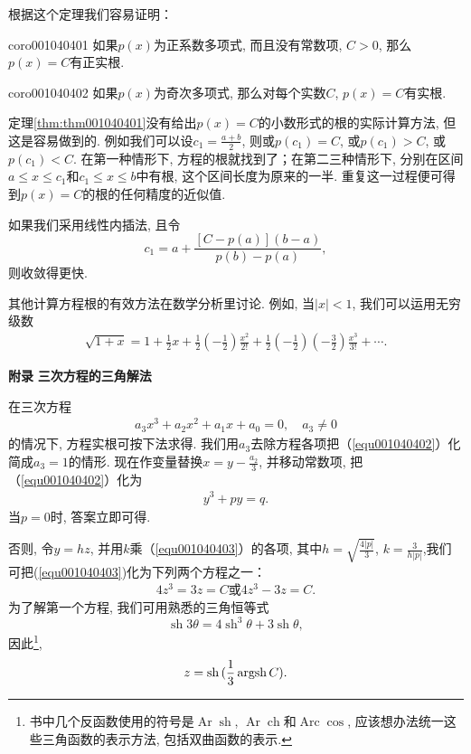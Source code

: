 根据这个定理我们容易证明：
\begin{corollary}{}{coro001040401}
如果$p(x)$为正系数多项式, 而且没有常数项, $C > 0$, 那么$p(x)=C$有正实根. 
\end{corollary}

\begin{corollary}{}{coro001040402}
如果$p(x)$为奇次多项式, 那么对每个实数$C$, $p(x)=C$有实根. 
\end{corollary}

定理\ref{thm:thm001040401}没有给出$p(x)=C$的小数形式的根的实际计算方法, 但这是容易做到的. 例如我们可以设$c_1 = \frac{a+b}{2}$, 则或$p(c_1) = C$, 或$p(c_1) > C$, 或$p(c_1) < C$. 在第一种情形下, 方程的根就找到了；在第二三种情形下, 分别在区间$a \le x \le c_1$和$c_1 \le x \le b$中有根, 这个区间长度为原来的一半. 重复这一过程便可得到$p(x)=C$的根的任何精度的近似值. 

如果我们采用线性内插法, 且令
\[
c_1 = a + \frac{[C-p(a)](b-a)}{p(b)-p(a)},
\]
则收敛得更快. 

其他计算方程根的有效方法在数学分析里讨论. 例如, 当$|x|<1$, 我们可以运用无穷级数
\begin{gather}\label{equ001040401}
\sqrt{1+x} = 1 + \frac{1}{2}x + \frac{1}{2}(-\frac{1}{2})\frac{x^2}{2!}+\frac{1}{2}(-\frac{1}{2})(-\frac{3}{2})\frac{x^3}{3!}+\cdots.
\end{gather}

\textbf{附录} \quad \textbf{三次方程的三角解法}

在三次方程
\begin{gather}\label{equ001040402}
a_3x^3+a_2x^2+a_1x+a_0=0,\quad a_3 \neq 0
\end{gather}
的情况下, 方程实根可按下法求得. 我们用$a_3$去除方程各项把（\ref{equ001040402}）化简成$a_3=1$的情形. 现在作变量替换$x=y-\frac{a_2}{3}$, 并移动常数项, 把（\ref{equ001040402}）化为
\begin{gather}\label{equ001040403}
y^3+py=q.
\end{gather}
当$p=0$时, 答案立即可得. 

否则, 令$y=hz$, 并用$k$乘（\ref{equ001040403}）的各项, 其中$h=\sqrt{\frac{4|p|}{3}}$, $k=\frac{3}{h|p|}$,我们可把(\ref{equ001040403})化为下列两个方程之一：
\begin{gather}\label{equ001040408}
4z^3=3z=C\text{或}4z^3-3z=C.
\end{gather}
为了解第一个方程, 我们可用熟悉的三角恒等式
\[
\operatorname{sh}{3\theta} = 4\operatorname{sh}^3{\theta} + 3\operatorname{sh}{\theta},
\]
因此\footnote{书中几个反函数使用的符号是$\operatorname{Ar}\operatorname{sh}$, $\operatorname{Ar}\operatorname{ch}$和$\operatorname{Arc}\operatorname{cos}$, 应该想办法统一这些三角函数的表示方法, 包括双曲函数的表示. },
\begin{gather}\label{equ001040409}
z = \operatorname{sh}{(\frac{1}{3}\operatorname{argsh}{C})}.
\end{gather}

